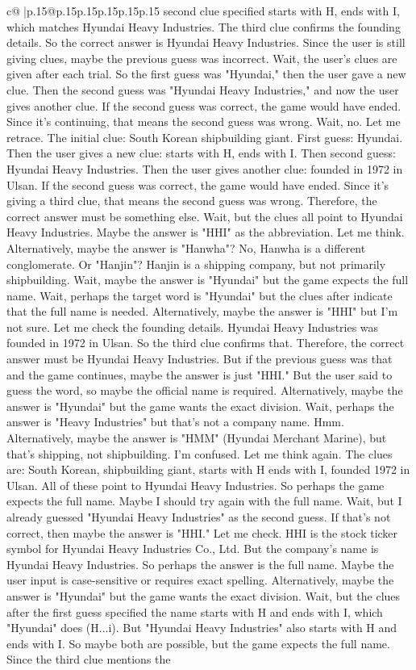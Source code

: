 \documentclass{article}
\begin{document}
{\begin{supertabular}{c@{$\;$}|p{.15\linewidth}@{}p{.15\linewidth}p{.15\linewidth}p{.15\linewidth}p{.15\linewidth}p{.15\linewidth}}
{{{second clue specified starts with H, ends with I, which matches Hyundai Heavy Industries. The third clue confirms the founding details. So the correct answer is Hyundai Heavy Industries. Since the user is still giving clues, maybe the previous guess was incorrect. Wait, the user's clues are given after each trial. So the first guess was "Hyundai," then the user gave a new clue. Then the second guess was "Hyundai Heavy Industries," and now the user gives another clue. If the second guess was correct, the game would have ended. Since it's continuing, that means the second guess was wrong. Wait, no. Let me retrace. The initial clue: South Korean shipbuilding giant. First guess: Hyundai. Then the user gives a new clue: starts with H, ends with I. Then second guess: Hyundai Heavy Industries. Then the user gives another clue: founded in 1972 in Ulsan. If the second guess was correct, the game would have ended. Since it's giving a third clue, that means the second guess was wrong. Therefore, the correct answer must be something else. Wait, but the clues all point to Hyundai Heavy Industries. Maybe the answer is "HHI" as the abbreviation. Let me think. Alternatively, maybe the answer is "Hanwha"? No, Hanwha is a different conglomerate. Or "Hanjin"? Hanjin is a shipping company, but not primarily shipbuilding. Wait, maybe the answer is "Hyundai" but the game expects the full name. Wait, perhaps the target word is "Hyundai" but the clues after indicate that the full name is needed. Alternatively, maybe the answer is "HHI" but I'm not sure. Let me check the founding details. Hyundai Heavy Industries was founded in 1972 in Ulsan. So the third clue confirms that. Therefore, the correct answer must be Hyundai Heavy Industries. But if the previous guess was that and the game continues, maybe the answer is just "HHI." But the user said to guess the word, so maybe the official name is required. Alternatively, maybe the answer is "Hyundai" but the game wants the exact division. Wait, perhaps the answer is "Heavy Industries" but that's not a company name. Hmm. Alternatively, maybe the answer is "HMM" (Hyundai Merchant Marine), but that's shipping, not shipbuilding. I'm confused. Let me think again. The clues are: South Korean, shipbuilding giant, starts with H ends with I, founded 1972 in Ulsan. All of these point to Hyundai Heavy Industries. So perhaps the game expects the full name. Maybe I should try again with the full name. Wait, but I already guessed "Hyundai Heavy Industries" as the second guess. If that's not correct, then maybe the answer is "HHI." Let me check. HHI is the stock ticker symbol for Hyundai Heavy Industries Co., Ltd. But the company's name is Hyundai Heavy Industries. So perhaps the answer is the full name. Maybe the user input is case-sensitive or requires exact spelling. Alternatively, maybe the answer is "Hyundai" but the game wants the exact division. Wait, but the clues after the first guess specified the name starts with H and ends with I, which "Hyundai" does (H...i). But "Hyundai Heavy Industries" also starts with H and ends with I. So maybe both are possible, but the game expects the full name. Since the third clue mentions the }}}
\end{supertabular}}
\end{document}

